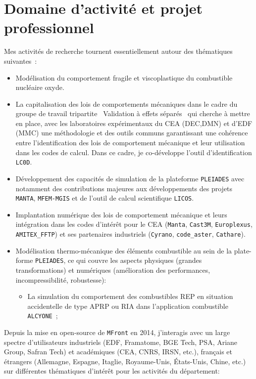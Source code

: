 \section{Domaine d'activité et projet professionnel}

Mes activités de recherche tournent essentiellement autour des
thématiques suivantes~:

\begin{itemize}
  \item Modélisation du comportement fragile et viscoplastique du
  combustible nucléaire oxyde.
  \item La capitalisation des lois de comportements mécaniques
  dans le cadre du groupe de travail tripartite \og~Validation à effets
  séparés~\fg{} qui cherche à mettre en place, avec les laboratoires
  expérimentaux du CEA (DEC,DMN) et d'EDF (MMC) une méthodologie et des
  outils communs garantissant une cohérence entre l'identification des
  lois de comportement mécanique et leur utilisation dans les codes de
  calcul. Dans ce cadre, je co-développe l'outil d'identification
  \texttt{LC0D}.
  \item Développement des capacités de simulation de la
  plateforme \texttt{PLEIADES} avec notamment des contributions majeures
  aux développements des projets \texttt{MANTA}, \texttt{MFEM-MGIS} et
  de l'outil de calcul scientifique \texttt{LICOS}.
  \item Implantation numérique des lois de comportement mécanique
  et leurs intégration dans les codes d'intérêt pour le CEA
  (\texttt{Manta}, \texttt{Cast3M}, \texttt{Europlexus},
  \texttt{AMITEX\_FFTP}) et ses partenaires industriels
  (\texttt{Cyrano}, \texttt{code\_aster}, \texttt{Cathare}).
  \item Modélisation thermo-mécanique des éléments combustible au
  sein de la plate-forme \texttt{PLEIADES}, ce qui couvre les aspects
  physiques (grandes transformations) et numériques (amélioration des
  performances, incompressibilité, robustesse):
  \begin{itemize}
    \item La simulation du comportement des combustibles REP en
    situation accidentelle de type APRP ou RIA dans l'application
    combustible \texttt{ALCYONE}~;
  \end{itemize}
\end{itemize}

Depuis la mise en open-source de \texttt{MFront} en 2014,
j'interagis avec un large spectre d'utilisateurs industriels (EDF,
Framatome, BGE Tech, PSA, Ariane Group, Safran Tech) et académiques
(CEA, CNRS, IRSN, etc.), français et étrangers (Allemagne, Espagne,
Itaglie, Royaume-Unis, États-Unis, Chine, etc.) sur différentes
thématiques d'intérêt pour les activités du département:

